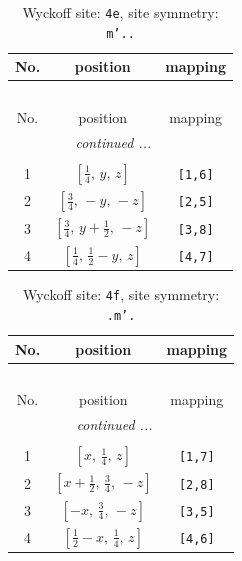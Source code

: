 \documentclass[fleqn,8pt]{jsarticle}
\begin{document}
\renewcommand{\arraystretch}{1.2}
\begin{longtable}{ccc}
\caption{Wyckoff site: {\tt 4e}, site symmetry: {\tt m'..}}
 \\
 \hline \hline
No. & position & mapping \\ \hline \endfirsthead

\multicolumn{2}{l}{\tablename\ \thetable{}} \\
 \hline \hline
No. & position & mapping \\ \hline \endhead

 \hline \hline
\multicolumn{2}{r}{\footnotesize\it continued ...} \\ \endfoot

 \hline \hline
\multicolumn{2}{r}{} \\ \endlastfoot

1 & $\left[ \frac{1}{4},\, y,\, z \right]$ & {\tt [1,6]} \\ \hline
2 & $\left[ \frac{3}{4},\, - y,\, - z \right]$ & {\tt [2,5]} \\ \hline
3 & $\left[ \frac{3}{4},\, y + \frac{1}{2},\, - z \right]$ & {\tt [3,8]} \\ \hline
4 & $\left[ \frac{1}{4},\, \frac{1}{2} - y,\, z \right]$ & {\tt [4,7]} \\
\end{longtable}
\renewcommand{\arraystretch}{1.2}
\begin{longtable}{ccc}
\caption{Wyckoff site: {\tt 4f}, site symmetry: {\tt .m'.}}
 \\
 \hline \hline
No. & position & mapping \\ \hline \endfirsthead

\multicolumn{2}{l}{\tablename\ \thetable{}} \\
 \hline \hline
No. & position & mapping \\ \hline \endhead

 \hline \hline
\multicolumn{2}{r}{\footnotesize\it continued ...} \\ \endfoot

 \hline \hline
\multicolumn{2}{r}{} \\ \endlastfoot

1 & $\left[ x,\, \frac{1}{4},\, z \right]$ & {\tt [1,7]} \\ \hline
2 & $\left[ x + \frac{1}{2},\, \frac{3}{4},\, - z \right]$ & {\tt [2,8]} \\ \hline
3 & $\left[ - x,\, \frac{3}{4},\, - z \right]$ & {\tt [3,5]} \\ \hline
4 & $\left[ \frac{1}{2} - x,\, \frac{1}{4},\, z \right]$ & {\tt [4,6]} \\
\end{longtable}
\end{document}
